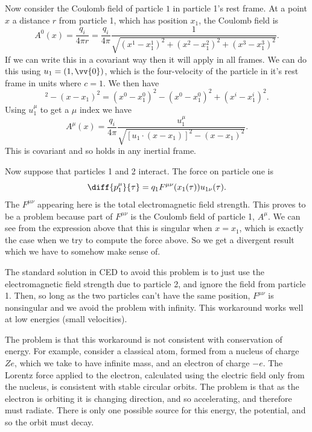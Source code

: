 \documentclass[fleqn]{NotesClass}
\begin{document}
    Now consider the Coulomb field of particle \(1\) in particle 1's rest frame.
    At a point \(x\) a distance \(r\) from particle 1, which has position \(x_1\), the Coulomb field is
    \begin{equation}
        A^0(x) = \frac{q_i}{4\pi r} = \frac{q_i}{4\pi} \frac{1}{\sqrt{(x^1 - x_1^1)^2 + (x^2 - x_1^2)^2 + (x^3 - x_1^3)^2}}.
    \end{equation}
    If we can write this in a covariant way then it will apply in all frames.
    We can do this using \(u_1 = (1, \vv{0})\), which is the four-velocity of the particle in it's rest frame in units where \(c = 1\).
    We then have
    \begin{equation}
        [u_1 \cdot (x - x_1)]^2 - (x - x_1)^2 = (x^0 - x_1^0)^2 - (x^0 - x_1^0)^2 + (x^i - x_1^i)^2.
    \end{equation}
    Using \(u_1^\mu\) to get a \(\mu\) index we have
    \begin{equation}
        A^\mu(x) = \frac{q_i}{4\pi} \frac{u_1^\mu}{\sqrt{[u_1 \cdot (x - x_1)]^2 - (x - x_1)^2}}.
    \end{equation}
    This is covariant and so holds in any inertial frame.
    
    Now suppose that particles 1 and 2 interact.
    The force on particle one is
    \begin{equation}
        \diff{p_1^\mu}{\tau} = q_1 F^{\mu\nu}(x_1(\tau))u_{1\nu}(\tau).
    \end{equation}
    The \(F^{\mu\nu}\) appearing here is the total electromagnetic field strength.
    This proves to be a problem because part of \(F^{\mu\nu}\) is the Coulomb field of particle 1, \(A^\mu\).
    We can see from the expression above that this is singular when \(x = x_1\), which is exactly the case when we try to compute the force above.
    So we get a divergent result which we have to somehow make sense of.
    
    The standard solution in CED to avoid this problem is to just use the electromagnetic field strength due to particle 2, and ignore the field from particle 1.
    Then, so long as the two particles can't have the same position, \(F^{\mu\nu}\) is nonsingular and we avoid the problem with infinity.
    This workaround works well at low energies (small velocities).
    
    The problem is that this workaround is not consistent with conservation of energy.
    For example, consider a classical atom, formed from a nucleus of charge \(Ze\), which we take to have infinite mass, and an electron of charge \(-e\).
    The Lorentz force applied to the electron, calculated using the electric field only from the nucleus, is consistent with stable circular orbits.
    The problem is that as the electron is orbiting it is changing direction, and so accelerating, and therefore must radiate.
    There is only one possible source for this energy, the potential, and so the orbit must decay.
    
\end{document}
